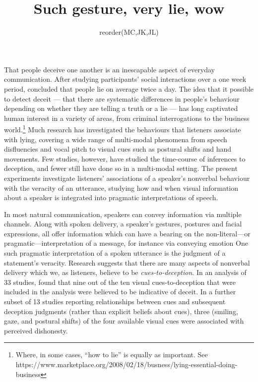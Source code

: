 \documentclass[a4paper,man,natbib]{apa6}
\title{Such gesture, very lie, wow}
\author{reorder(MC,JK,JL)}
\affiliation{Psychology, PPLS, University of Edinburgh}
\newcommand*{\term}[1]{\emph{#1}} %
\begin{document}



\maketitle
\linenumbers
\noindent
That people deceive one another is an inescapable aspect of everyday communication.
After studying participants' social interactions over a one week period, \citet{DePaulo1996} concluded that people lie on average twice a day.
The idea that it possible to detect deceit --- that there are systematic differences in people's behaviour depending on whether they are telling a truth or a lie --- has long captivated human interest in a variety of areas, from criminal interrogations to the business world.\footnote{Where, in some cases, ``how to lie'' is equally as important. See https://www.marketplace.org/2008/02/18/busness/lying-essential-doing-business}
Much research has investigated the behaviours that listeners associate with lying, covering a wide range of multi-modal phenomena from speech disfluencies and vocal pitch to visual cues such as postural shifts and hand movements.
Few studies, however, have studied the time-course of inferences to deception, and fewer still have done so in a multi-modal setting.
The present experiments investigate listeners' associations of a speaker's nonverbal behaviour with the veracity of an utterance, studying how and when visual information about a speaker is integrated into pragmatic interpretations of speech.

In most natural communication, speakers can convey information via multiple channels.
Along with spoken delivery, a speaker's gestures, postures and facial expressions, all offer information which can have a bearing on the non-literal---or pragmatic---interpretation of a message, for instance via conveying emotion \citep{Busso2004, Gregersen2005}
One such pragmatic interpretation of a spoken utterance is the judgment of a statement's veracity.
Research suggests that there are many aspects of nonverbal delivery which we, as listeners, believe to be \term{cues-to-deception}. 
In an analysis of 33 studies, \citet{Zuckerman1981} found that nine out of the ten visual cues-to-deception that were included in the analysis were believed to be indicative of deceit. 
In a further subset of 13 studies reporting relationships between cues and subsequent deception judgments (rather than explicit beliefs about cues), three (smiling, gaze, and postural shifts) of the four available visual cues were associated with perceived dishonesty.
\end{document}
